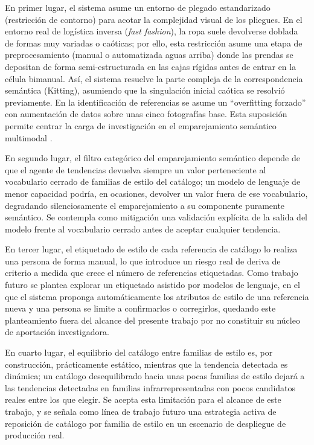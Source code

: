 \documentclass[conference]{IEEEtran}
\begin{document}
En primer lugar, el sistema asume un entorno de plegado estandarizado (restricción de contorno) para acotar la complejidad visual de los pliegues. En el entorno real de logística inversa (\emph{fast fashion}), la ropa suele devolverse doblada de formas muy variadas o caóticas; por ello, esta restricción asume una etapa de preprocesamiento (manual o automatizada aguas arriba) donde las prendas se depositan de forma semi-estructurada en las cajas rígidas antes de entrar en la célula bimanual. Así, el sistema resuelve la parte compleja de la correspondencia semántica (Kitting), asumiendo que la singulación inicial caótica se resolvió previamente. En la identificación de referencias se asume un ``overfitting forzado'' con aumentación de datos sobre unas cinco fotografías base. Esta suposición permite centrar la carga de investigación en el emparejamiento semántico multimodal \cite{guo2019imaterialist, radford2021clip}.


En segundo lugar, el filtro categórico del emparejamiento semántico depende
de que el agente de tendencias devuelva siempre un valor perteneciente al
vocabulario cerrado de familias de estilo del catálogo; un modelo de
lenguaje de menor capacidad podría, en ocasiones, devolver un valor fuera de
ese vocabulario, degradando silenciosamente el emparejamiento a su
componente puramente semántico. Se contempla como mitigación una validación
explícita de la salida del modelo frente al vocabulario cerrado antes de
aceptar cualquier tendencia.

En tercer lugar, el etiquetado de estilo de cada referencia de catálogo lo
realiza una persona de forma manual, lo que introduce un riesgo real de
deriva de criterio a medida que crece el número de referencias etiquetadas.
Como trabajo futuro se plantea explorar un etiquetado asistido por modelos
de lenguaje, en el que el sistema proponga automáticamente los atributos de
estilo de una referencia nueva y una persona se limite a confirmarlos o
corregirlos, quedando este planteamiento fuera del alcance del presente
trabajo por no constituir su núcleo de aportación investigadora.

En cuarto lugar, el equilibrio del catálogo entre familias de estilo es, por
construcción, prácticamente estático, mientras que la tendencia detectada es
dinámica; un catálogo desequilibrado hacia unas pocas familias de estilo
dejará a las tendencias detectadas en familias infrarrepresentadas con pocos
candidatos reales entre los que elegir. Se acepta esta limitación para el
alcance de este trabajo, y se señala como línea de trabajo futuro una
estrategia activa de reposición de catálogo por familia de estilo en un
escenario de despliegue de producción real.
\end{document}
